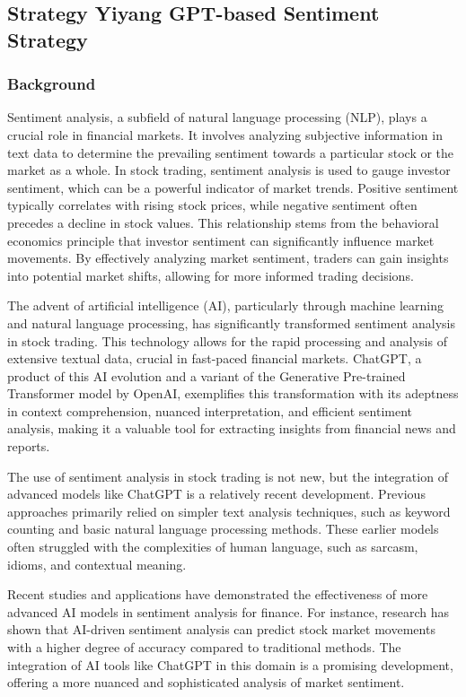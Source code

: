 \subsection{Strategy Yiyang GPT-based Sentiment Strategy}

\subsubsection{Background}

Sentiment analysis, a subfield of natural language processing (NLP), plays a crucial role in financial markets. It involves analyzing subjective information in text data to determine the prevailing sentiment towards a particular stock or the market as a whole. In stock trading, sentiment analysis is used to gauge investor sentiment, which can be a powerful indicator of market trends. Positive sentiment typically correlates with rising stock prices, while negative sentiment often precedes a decline in stock values. This relationship stems from the behavioral economics principle that investor sentiment can significantly influence market movements. By effectively analyzing market sentiment, traders can gain insights into potential market shifts, allowing for more informed trading decisions.

The advent of artificial intelligence (AI), particularly through machine learning and natural language processing, has significantly transformed sentiment analysis in stock trading. This technology allows for the rapid processing and analysis of extensive textual data, crucial in fast-paced financial markets. ChatGPT, a product of this AI evolution and a variant of the Generative Pre-trained Transformer model by OpenAI, exemplifies this transformation with its adeptness in context comprehension, nuanced interpretation, and efficient sentiment analysis, making it a valuable tool for extracting insights from financial news and reports.

The use of sentiment analysis in stock trading is not new, but the integration of advanced models like ChatGPT is a relatively recent development. Previous approaches primarily relied on simpler text analysis techniques, such as keyword counting and basic natural language processing methods. These earlier models often struggled with the complexities of human language, such as sarcasm, idioms, and contextual meaning.

Recent studies and applications have demonstrated the effectiveness of more advanced AI models in sentiment analysis for finance. For instance, research has shown that AI-driven sentiment analysis can predict stock market movements with a higher degree of accuracy compared to traditional methods. The integration of AI tools like ChatGPT in this domain is a promising development, offering a more nuanced and sophisticated analysis of market sentiment.

